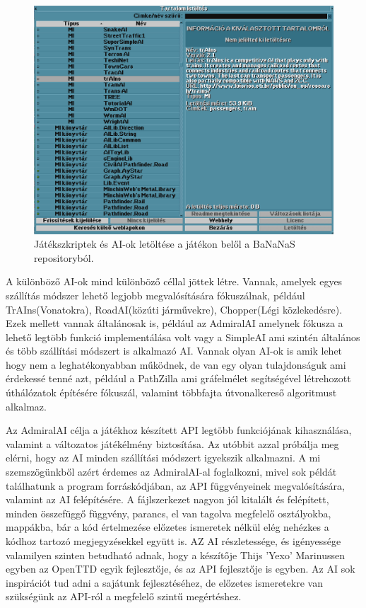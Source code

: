 \begin{figure}
	\centering
	\includegraphics[width=\textwidth]{images/bananas.png}
	\caption{Játékszkriptek és AI-ok letöltése a játékon belől a BaNaNaS repositoryból.}
	\label{fig:bananas}
\end{figure}

A különböző AI-ok mind különböző céllal jöttek létre. Vannak, amelyek egyes szállítás módszer lehető legjobb megvalósítására fókuszálnak, például TrAIns(Vonatokra), RoadAI(közúti járművekre), Chopper(Légi közlekedésre). Ezek mellett vannak általánosak is, például az AdmiralAI amelynek fókusza a lehető legtöbb funkció implementálása volt vagy a SimpleAI ami szintén általános és több szállítási módszert is alkalmazó AI. Vannak olyan AI-ok is amik lehet hogy nem a leghatékonyabban működnek, de van egy olyan tulajdonságuk ami érdekessé tenné azt, például a PathZilla ami gráfelmélet segítségével létrehozott úthálózatok építésére fókuszál, valamint többfajta útvonalkereső algoritmust alkalmaz.

Az AdmiralAI célja a játékhoz készített API legtöbb funkciójának kihasználása, valamint a változatos játékélmény biztosítása. Az utóbbit azzal próbálja meg elérni, hogy az AI minden szállítási módszert igyekszik alkalmazni. A mi szemszögünkből azért érdemes az AdmiralAI-al foglalkozni, mivel sok példát találhatunk a program forráskódjában, az API függvényeinek megvalósítására, valamint az AI felépítésére. A fájlszerkezet nagyon jól kitalált és felépített, minden összefüggő függvény, parancs, el van tagolva megfelelő osztályokba, mappákba, bár a kód értelmezése előzetes ismeretek nélkül elég nehézkes a kódhoz tartozó megjegyzésekkel együtt is. AZ AI részletessége, és igényessége valamilyen szinten betudható adnak, hogy a készítője Thijs 'Yexo' Marinussen egyben az OpenTTD egyik fejlesztője, és az API fejlesztője is egyben. Az AI sok inspirációt tud adni a sajátunk fejlesztéséhez, de előzetes ismeretekre van szükségünk az API-ról a megfelelő szintű megértéshez.


